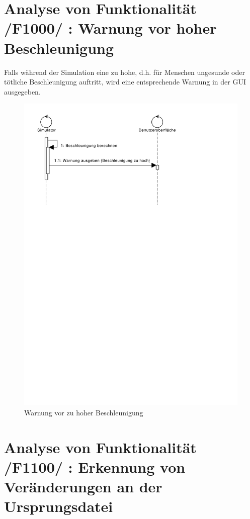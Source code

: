 \section{Analyse von Funktionalität /F1000/ :  Warnung vor hoher Beschleunigung}
Falls während der Simulation eine zu hohe, d.h. für Menschen ungesunde oder tötliche Beschleunigung auftritt, wird eine entsprechende Warnung in der GUI ausgegeben.
\begin{figure}
\includegraphics[width=\linewidth]{bilder/Warnung_Beschleunigung}
\caption{Warnung vor zu hoher Beschleunigung}
\end{figure}
\section{Analyse von Funktionalität /F1100/ :  Erkennung von Veränderungen an der Ursprungsdatei}
